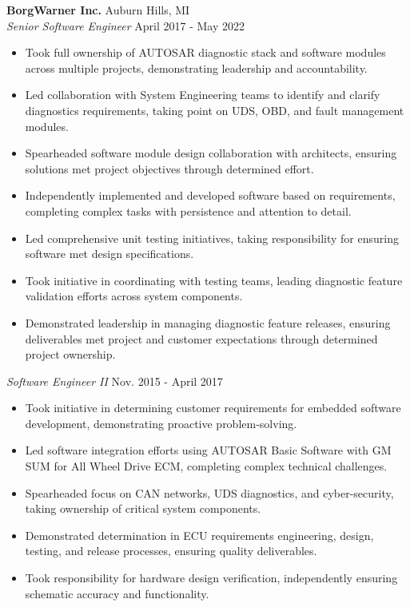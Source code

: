 \vspace{0.75em}

\noindent
\textbf{BorgWarner Inc.} \hfill Auburn Hills, MI \\
\textit{Senior Software Engineer} \hfill April 2017 - May 2022 \\
\begin{itemize}[leftmargin=*,noitemsep,topsep=3pt]
    \item Took full ownership of AUTOSAR diagnostic stack and software modules across multiple projects, demonstrating leadership and accountability.
    \item Led collaboration with System Engineering teams to identify and clarify diagnostics requirements, taking point on UDS, OBD, and fault management modules.
    \item Spearheaded software module design collaboration with architects, ensuring solutions met project objectives through determined effort.
    \item Independently implemented and developed software based on requirements, completing complex tasks with persistence and attention to detail.
    \item Led comprehensive unit testing initiatives, taking responsibility for ensuring software met design specifications.
    \item Took initiative in coordinating with testing teams, leading diagnostic feature validation efforts across system components.
    \item Demonstrated leadership in managing diagnostic feature releases, ensuring deliverables met project and customer expectations through determined project ownership.
\end{itemize}

\vspace{0.5em}

\noindent
\textit{Software Engineer II} \hfill Nov. 2015 - April 2017 \\
\begin{itemize}[leftmargin=*,noitemsep,topsep=3pt]
    \item Took initiative in determining customer requirements for embedded software development, demonstrating proactive problem-solving.
    \item Led software integration efforts using AUTOSAR Basic Software with GM SUM for All Wheel Drive ECM, completing complex technical challenges.
    \item Spearheaded focus on CAN networks, UDS diagnostics, and cyber-security, taking ownership of critical system components.
    \item Demonstrated determination in ECU requirements engineering, design, testing, and release processes, ensuring quality deliverables.
    \item Took responsibility for hardware design verification, independently ensuring schematic accuracy and functionality.
\end{itemize}